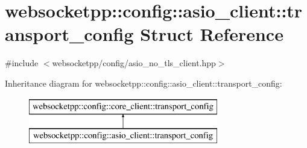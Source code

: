 \hypertarget{structwebsocketpp_1_1config_1_1asio__client_1_1transport__config}{}\section{websocketpp\+:\+:config\+:\+:asio\+\_\+client\+:\+:transport\+\_\+config Struct Reference}
\label{structwebsocketpp_1_1config_1_1asio__client_1_1transport__config}


{\ttfamily \#include $<$websocketpp/config/asio\+\_\+no\+\_\+tls\+\_\+client.\+hpp$>$}

Inheritance diagram for websocketpp\+:\+:config\+:\+:asio\+\_\+client\+:\+:transport\+\_\+config\+:\begin{figure}[H]
\begin{center}
\leavevmode
\includegraphics[height=2.000000cm]{structwebsocketpp_1_1config_1_1asio__client_1_1transport__config}
\end{center}
\end{figure}
